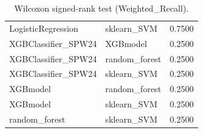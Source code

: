 \begin{table}[t]
\begin{tabular}{llr}
LogisticRegression & sklearn_SVM & 0.7500 \\
XGBClassifier_SPW24 & XGBmodel & 0.2500 \\
XGBClassifier_SPW24 & random_forest & 0.2500 \\
XGBClassifier_SPW24 & sklearn_SVM & 0.2500 \\
XGBmodel & random_forest & 0.2500 \\
XGBmodel & sklearn_SVM & 0.2500 \\
random_forest & sklearn_SVM & 0.2500 \\
\bottomrule
\end{tabular}
\caption{Wilcoxon signed-rank test (Weighted_Recall).}
\label{tab:wilcoxon_Weighted_Recall}
\end{table}